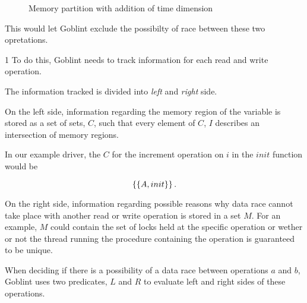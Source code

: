 \documentclass[..thesis.tex]{subfiles}
\begin{document}
\begin{figure}[H]
    \caption{Memory partition with addition of time dimension}
\end{figure}

This would let Goblint exclude the possibilty of race between these two opretations. 

1
To do this, Goblint needs to track information for each read and write operation.


The information tracked is divided into \textit{left} and \textit{right} side. 

On the left side, information regarding the memory region of the variable is stored as a set of sets, $C$, such that every element of $C$, $I$ describes an intersection of memory regions.

In our example driver, the $C$ for the increment operation on $i$ in the $init$ function would be 

\begin{equation*}
\left\lbrace \left\lbrace A, init \right\rbrace \right\rbrace \text{.}
\end{equation*} 

On the right side, information regarding possible reasons why data race cannot take place with another read or write operation is stored in a set $M$. For an example, $M$ could contain the set of locks held at the specific operation or wether or not the thread running the procedure containing the operation is guaranteed to be unique.

When deciding if there is a possibility of a data race between operations $a$ and $b$, Goblint uses two predicates, $L$ and $R$ to evaluate left and right sides of these operations. 
\end{document}
